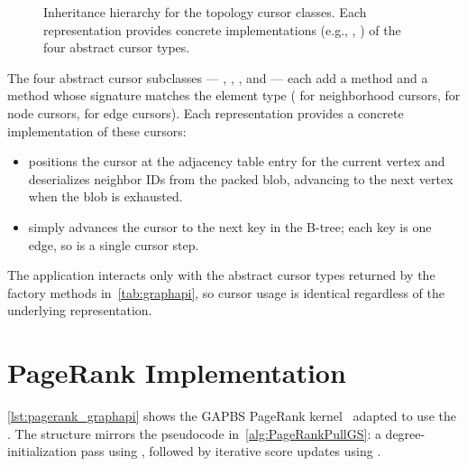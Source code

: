 \begin{figure}[h!]
\caption{Inheritance hierarchy for the topology cursor classes.  Each representation provides concrete implementations (e.g., , ) of the four abstract cursor types.}
\label{fig:iterator_diagram}
\end{figure}

The four abstract cursor subclasses --- , , , and  --- each add a  method and a  method whose signature matches the element type ( for neighborhood cursors,  for node cursors,  for edge cursors).
Each representation provides a concrete implementation of these cursors:
\begin{itemize}
  \item {} positions the \wt{} cursor at the adjacency table entry for the current vertex and deserializes neighbor IDs from the packed blob, advancing to the next vertex when the blob is exhausted.
  \item {} simply advances the \wt{} cursor to the next key in the B-tree; each key is one edge, so  is a single cursor step.
\end{itemize}
The application interacts only with the abstract cursor types returned by the factory methods in~\autoref{tab:graphapi}, so cursor usage is identical regardless of the underlying representation.

\section{PageRank Implementation}
\label{appendix:pagerank_graphapi}

\autoref{lst:pagerank_graphapi} shows the GAPBS PageRank kernel~\cite{beamer2015gap} adapted to use the \api{}.
The structure mirrors the pseudocode in~\autoref{alg:PageRankPullGS}: a degree-initialization pass using , followed by iterative score updates using .

